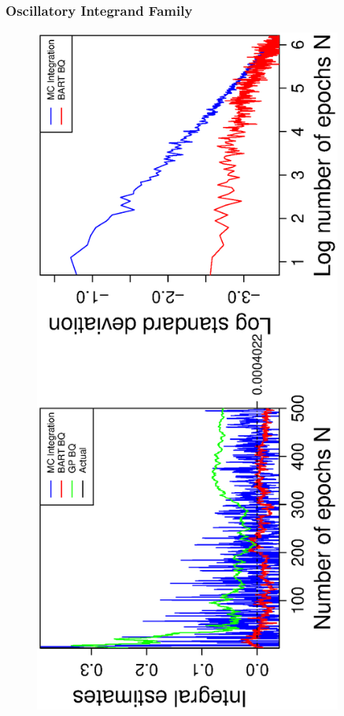 \subsubsection*{Oscillatory Integrand Family}
\vspace{-1.5cm}
\begin{figure}[H]
  \centering
  \hspace{-1.6cm}
  \begin{minipage}[b]{0.4\textwidth}
    \includegraphics[width = 0.9\textwidth, angle = -90]{report/Figures/5/convergenceMean51Dimensions.eps}

\end{minipage}
\end{figure}
